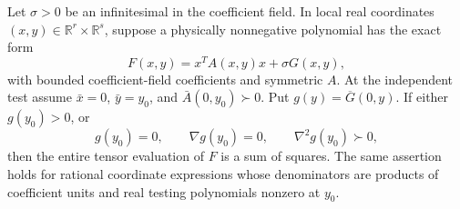 \begin{lemma}\label{p24f8a75e651e:lem:weighted-contact}
Let $\sigma>0$ be an infinitesimal in the coefficient field. In local real coordinates $(x,y)\in\mathbb R^r\times\mathbb R^s$, suppose a physically nonnegative polynomial has the exact form
\[
F(x,y)=x^TA(x,y)x+\sigma G(x,y),
\]
with bounded coefficient-field coefficients and symmetric $A$. At the independent test assume $\bar x=0$, $\bar y=y_0$, and $\bar A(0,y_0)\succ0$. Put $g(y)=\overline{G}(0,y)$. If either $g(y_0)>0$, or
\[
g(y_0)=0,\qquad \nabla g(y_0)=0,\qquad \nabla^2g(y_0)\succ0,
\]
then the entire tensor evaluation of $F$ is a sum of squares. The same assertion holds for rational coordinate expressions whose denominators are products of coefficient units and real testing polynomials nonzero at $y_0$.
\end{lemma}
